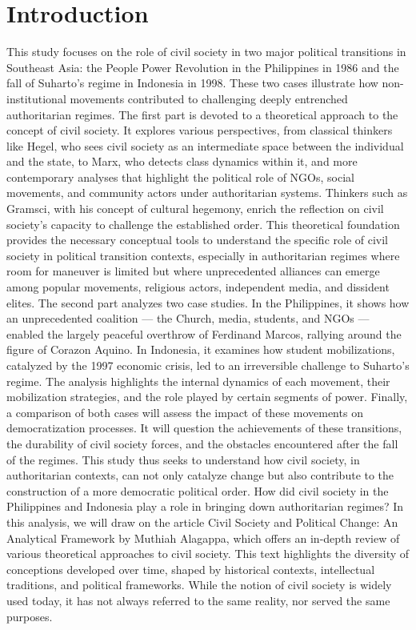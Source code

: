 \documentclass[12pt]{article}
\begin{document}
\section*{Introduction}
This study focuses on the role of civil society in two major political transitions in Southeast Asia: the People Power Revolution in the Philippines in 1986 and the fall of Suharto’s regime in Indonesia in 1998. These two cases illustrate how non-institutional movements contributed to challenging deeply entrenched authoritarian regimes.
The first part is devoted to a theoretical approach to the concept of civil society. It explores various perspectives, from classical thinkers like Hegel, who sees civil society as an intermediate space between the individual and the state, to Marx, who detects class dynamics within it, and more contemporary analyses that highlight the political role of NGOs, social movements, and community actors under authoritarian systems. Thinkers such as Gramsci, with his concept of cultural hegemony, enrich the reflection on civil society’s capacity to challenge the established order. This theoretical foundation provides the necessary conceptual tools to understand the specific role of civil society in political transition contexts, especially in authoritarian regimes where room for maneuver is limited but where unprecedented alliances can emerge among popular movements, religious actors, independent media, and dissident elites.
The second part analyzes two case studies. In the Philippines, it shows how an unprecedented coalition — the Church, media, students, and NGOs — enabled the largely peaceful overthrow of Ferdinand Marcos, rallying around the figure of Corazon Aquino. In Indonesia, it examines how student mobilizations, catalyzed by the 1997 economic crisis, led to an irreversible challenge to Suharto’s regime. The analysis highlights the internal dynamics of each movement, their mobilization strategies, and the role played by certain segments of power.
Finally, a comparison of both cases will assess the impact of these movements on democratization processes. It will question the achievements of these transitions, the durability of civil society forces, and the obstacles encountered after the fall of the regimes. This study thus seeks to understand how civil society, in authoritarian contexts, can not only catalyze change but also contribute to the construction of a more democratic political order.
How did civil society in the Philippines and Indonesia play a role in bringing down authoritarian regimes?
In this analysis, we will draw on the article Civil Society and Political Change: An Analytical Framework by Muthiah Alagappa, which offers an in-depth review of various theoretical approaches to civil society. This text highlights the diversity of conceptions developed over time, shaped by historical contexts, intellectual traditions, and political frameworks. While the notion of civil society is widely used today, it has not always referred to the same reality, nor served the same purposes.
\end{document}
